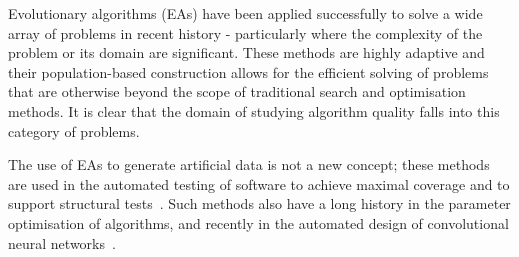 
Evolutionary algorithms (EAs) have been applied successfully to solve a wide
array of problems in recent history \-- particularly where the complexity of the
problem or its domain are significant. These methods are highly adaptive and
their population-based construction allows for the efficient solving of problems
that are otherwise beyond the scope of traditional search and optimisation
methods. It is clear that the domain of studying algorithm quality falls into
this category of problems.


The use of EAs to generate artificial data is not a new concept; these methods
are used in the automated testing of software to achieve maximal coverage and to
support structural tests~\cite{Koleejan2015, Michael2001, Sharifipour2018}. Such
methods also have a long history in the parameter optimisation of algorithms,
and recently in the automated design of convolutional neural
networks~\cite{Suganuma2017, Sun2018}.
